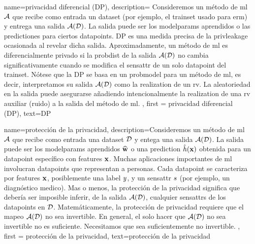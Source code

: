 {{
{name=privacidad diferencial (DP),
 description={
 	Consideremos un método de \gls{ml} $\mathcal{A}$ que recibe como entrada un \gls{dataset} (por ejemplo, el \gls{trainset} 
 	usado para \gls{erm}) y entrega una salida $\mathcal{A}(\mathcal{D})$. La salida 
 	puede ser los \gls{modelparams} aprendidos o las \gls{prediction}es para ciertos \gls{datapoint}s. 
 	DP es una medida precisa de la \gls{privleakage} ocasionada al revelar dicha salida.
	Aproximadamente, un método de \gls{ml} es diferencialmente privado si la \gls{probdist} 
 	de la salida $\mathcal{A}(\mathcal{D})$ no cambia significativamente cuando se modifica el \gls{sensattr} 
 	de un solo \gls{datapoint} del \gls{trainset}. Nótese que la DP 
 	se basa en un \gls{probmodel} para un método de \gls{ml}, es decir, interpretamos su salida $\mathcal{A}(\mathcal{D})$ 
 	como la \gls{realization} de un \gls{rv}. La aleatoriedad en la salida puede asegurarse añadiendo intencionalmente la
 	\gls{realization} de una \gls{rv} auxiliar (ruido) a la salida del método de  \gls{ml}.
	}, 
	first = {privacidad diferencial (DP)}, text={DP} 
}

{name=protección de la privacidad,
    description={Consideremos un método de \gls{ml}  $\mathcal{A}$ que recibe como entrada 
	 una \gls{dataset} $\mathcal{D}$ y entega una salida $\mathcal{A}(\mathcal{D})$. La salida 
	 puede ser los \gls{modelparams} aprendidos $\widehat{{\bf w}}$ o una \gls{prediction} 
	 $\hat{h}({\bf x})$ obtenida para un \gls{datapoint} específico con \gls{feature}s 
	 ${\bf x}$. Muchas aplicaciones importantes de \gls{ml} involucran \gls{datapoint}s 
		que representan a personas. Cada \gls{datapoint} se caracteriza por \gls{feature}s ${\bf x}$, 
		posiblemente una \gls{label} $y$, y un \gls{sensattr} $s$ (por ejemplo, un diagnóstico medico). 
		Mas o menos, la protección de la privacidad significa que debería ser imposible inferir, de la salida $\mathcal{A}(\mathcal{D})$, 
		cualquier \gls{sensattr}s de los \gls{datapoint}s en $\mathcal{D}$. Matemáticamente, la protección de privacidad requiere que  
		el mapeo $\mathcal{A}(\mathcal{D})$ no sea invertible. En general, el solo hacer que  $\mathcal{A}(\mathcal{D})$ no sea invertible 
		no es suficiente. Necesitamos que sea suficientemente no invertible. 
	}, 
	first = {protección de la privacidad}, text={protección de la privacidad} 
}

}}
